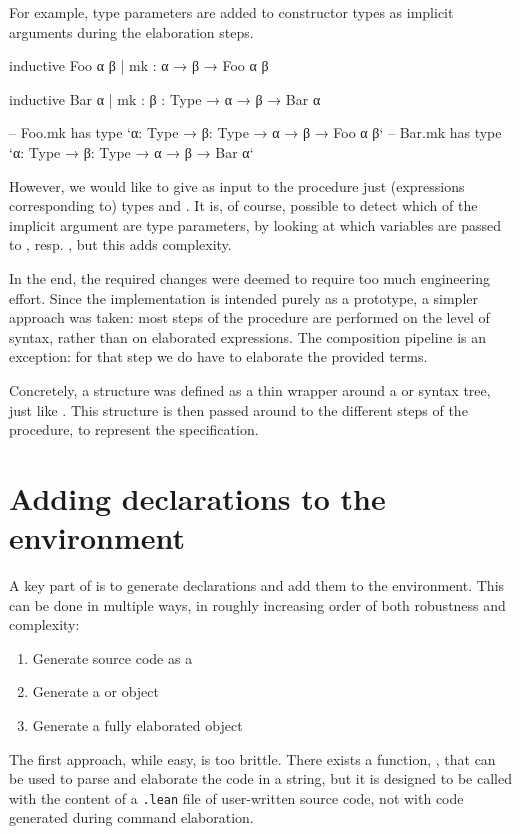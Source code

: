 For example, type parameters are added to constructor types as implicit arguments during the elaboration steps.
\begin{leancode}
    inductive Foo α β
      | mk : α → β → Foo α β

    inductive Bar α
      | mk : {β : Type} → α → β → Bar α

    -- Foo.mk has type `{α: Type} → {β: Type} → α → β → Foo α β`
    -- Bar.mk has type `{α: Type} → {β: Type} → α → β → Bar α`
\end{leancode}
However, we would like to give as input to the procedure just (expressions corresponding to) types  and .
It is, of course, possible to detect which of the implicit argument are type parameters, by looking at which variables are passed to , resp. , but this adds complexity.

In the end, the required changes were deemed to require too much engineering effort. 
Since the implementation is intended purely as a prototype, a simpler approach was taken:
most steps of the procedure are performed on the level of syntax, rather than on elaborated expressions. 
The composition pipeline is an exception: for that step we do have to elaborate the provided terms.


Concretely, a  structure was defined as a thin wrapper around a \data{} or \codata{} syntax tree, just like .
This structure is then passed around to the different steps of the procedure, to represent the specification.



\section{Adding declarations to the environment}
A key part of  is to generate declarations and add them to the environment.
This can be done in multiple ways, in roughly increasing order of both robustness and complexity:
\begin{enumerate}
    \item Generate source code as a 
    \item Generate a  or  object
    \item Generate a fully elaborated  object
\end{enumerate}

The first approach, while easy, is too brittle. There exists a function, , that can be used to parse and elaborate the code in a string, but it is designed to be called with the content of a \texttt{.lean} file of user-written source code, not with code generated during command elaboration.


